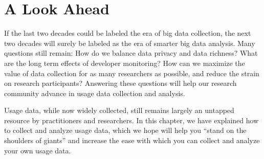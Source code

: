 %
%
%

\section{A Look Ahead}

If the last two decades could be labeled the era
of big data collection, 
the next two decades will surely be labeled as the 
era of smarter big data analysis.
Many questions still remain:
How do we balance data privacy and data richness?
What are the long term effects of developer monitoring?
How can we maximize the value of data collection
for as many researchers as possible, and reduce the 
strain on research participants?
Answering these questions will help our research
community advance in usage data collection and analysis.

Usage data, while now widely collected, still remains largely 
an untapped resource by practitioners and researchers.
In this chapter, we have explained how to collect and 
analyze usage data, which we hope will help you ``stand
on the shoulders of giants'' and increase the ease
with which you can collect and analyze your own usage data.